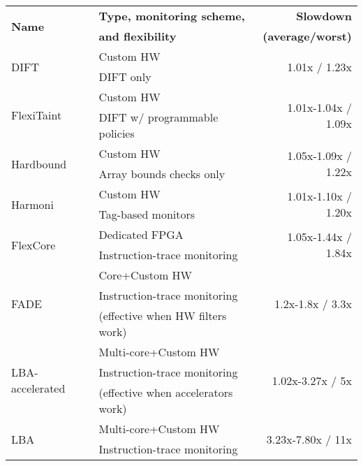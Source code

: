 \begin{tabular}{|l|l|r|}

\hline
\multirow{2}{*}{\bf Name} & {\bf Type, monitoring scheme,} & {\bf Slowdown} \\ 
& {\bf and flexibility} & {\bf (average/worst)} \\ \hline\hline


\multirow{2}{*}{DIFT \cite{dift-asplos04}} & Custom HW & \multirow{2}{*}{1.01x / 1.23x} \\ 
& DIFT only & \\ \hline
\multirow{2}{*}{FlexiTaint \cite{flexitaint-hpca08}} & Custom HW & \multirow{2}{*}{1.01x-1.04x / 1.09x} \\ 
& DIFT w/ programmable policies & \\ \hline
\multirow{2}{*}{Hardbound \cite{hardbound-asplos08}} & Custom HW & \multirow{2}{*}{1.05x-1.09x / 1.22x} \\
& Array bounds checks only & \\ \hline
\multirow{2}{*}{Harmoni \cite{harmoni-dsn12}} & Custom HW & \multirow{2}{*}{1.01x-1.10x / 1.20x} \\
& Tag-based monitors & \\ \hline\hline

\multirow{2}{*}{FlexCore \cite{flexcore-micro10}} & Dedicated FPGA & \multirow{2}{*}{1.05x-1.44x / 1.84x} \\ 
& Instruction-trace monitoring & \\ \hline
\multirow{3}{*}{FADE \cite{fade-hpca14}} & Core+Custom HW & \multirow{3}{*}{1.2x-1.8x / 3.3x} \\ 
& Instruction-trace monitoring  & \\ 
& (effective when HW filters work) & \\ \hline
\multirow{3}{*}{LBA-accelerated \cite{lba-isca08}} & Multi-core+Custom HW & \multirow{3}{*}{1.02x-3.27x / 5x} \\ 
& Instruction-trace monitoring  & \\
& (effective when accelerators work) & \\ \hline
\multirow{2}{*}{LBA \cite{lba-asid06}} & Multi-core+Custom HW & \multirow{2}{*}{3.23x-7.80x / 11x} \\ 
& Instruction-trace monitoring & \\ \hline\hline


\end{tabular}
